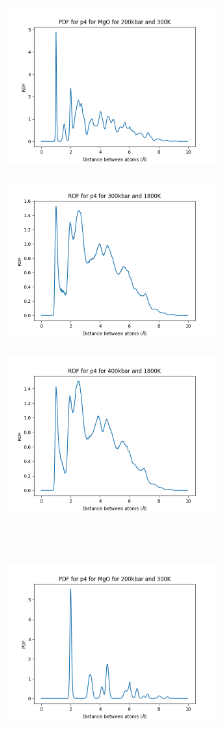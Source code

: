 \documentclass[a4paper,12pt]{article}
\begin{document}
\begin{figure}[h!!!!!!!!!!]
	\centering
	\begin{subfigure}{0.32\textwidth}
		\centering
		\includegraphics[width=5.5cm]{figures/p4_rdf_p200_t300.png}
		\label{Fig13a}
	\end{subfigure}%
	\begin{subfigure}{0.32\textwidth}
		\centering
		\includegraphics[width=5.5cm]{figures/p4_rdf_p300_t1800.png}
		\label{Fig13b}
	\end{subfigure}%
	\begin{subfigure}{0.32\textwidth}
		\centering
		\includegraphics[width=5.5cm]{figures/p4_rdf_p400_t1800.png}
		\label{Fig13c}
	\end{subfigure}%
	\\
	\begin{subfigure}{0.32\textwidth}
		\centering
		\includegraphics[width=5.5cm]{figures/p4_pdf_MgO_p200_t300.png}

\end{subfigure}
\end{figure}
\end{document}
